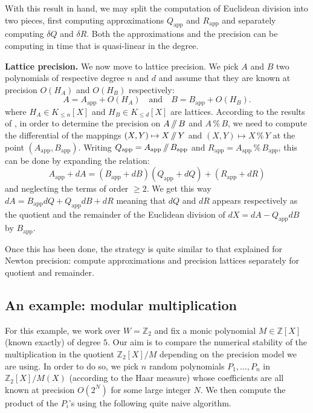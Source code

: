 \documentclass{sig-alternate-05-2015}
\newcommand{\Z}{\mathbb Z}
\renewcommand{\mod}{\,\%\,}
\renewcommand{\div}{\,/\hspace{-0.3em}/\,}
\newcommand{\app}{\textrm{app}}
\def\todo#1{\ \!\!{\color{red} #1}}
\begin{document}
With this result in hand, we may split the computation of
Euclidean division into two pieces, first computing approximations
$Q_\app$ and $R_\app$ and separately computing $\delta Q$ and $\delta R$.
Both the approximations and the precision can be computing in time that is
quasi-linear in the degree. 

\medskip

\noindent
{\bf Lattice precision.}
We now move to lattice precision. We pick $A$ and $B$ two polynomials 
of respective degree $n$ and $d$ and assume that they are known at 
precision $O(H_A)$ and $O(H_B)$ respectively:
$$A = A_\app + O(H_A)
\quad \text{and} \quad
B = B_\app + O(H_B).$$
where $H_A \in K_{\leq n}[X]$ and $H_B \in K_{\leq d}[X]$ are lattices. 
According to the results of \cite{caruso-roe-vaccon:14a}, in order to determine the 
precision on $A \div B$ and $A \mod B$, we need to compute the 
differential of the mappings $(X,Y) \mapsto X \div Y$ and $(X,Y)
\mapsto X \mod Y$ at the point $(A_\app, B_\app)$. Writing $Q_\app = A_\app \div
B_\app$ and $R_\app = A_\app \mod B_\app$, this can be done by
expanding the relation:
$$A_\app + dA = (B_\app + dB) (Q_\app + dQ) + (R_\app + dR)$$
and neglecting the terms of order $\geq 2$. We get this way 
$dA = B_\app dQ + Q_\app dB + dR$
meaning that $dQ$ and $dR$ appears respectively as the quotient and
the remainder of the Euclidean division of $dX = dA - Q_\app dB$ by $B_\app$.

Once this has been done, the strategy is quite similar to that explained 
for Newton precision: compute approximations and precision lattices
separately for quotient and remainder.

\subsection{An example: modular multiplication}

For this example, we work over $W = \Z_2$ and fix a monic polynomial $M 
\in \Z[X]$ (known exactly) of degree $5$. Our aim is to compare the 
numerical stability of the multiplication in the quotient $\Z_2[X]/M$ 
depending on the precision model we are using. In order to do so, we 
pick $n$ random polynomials $P_1, \ldots, P_n$ in $\Z_2[X]/M(X)$ 
(according to the Haar measure) whose coefficients are all known at 
precision $O(2^N)$ for some large integer $N$. We then compute the 
product of the $P_i$'s using the following quite naive algorithm.
\end{document}
